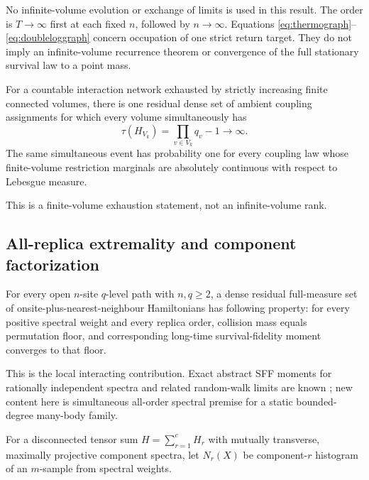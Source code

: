 No infinite-volume evolution or exchange of limits is used in this result.
The order is $T\to\infty$ first at each fixed $n$, followed by
$n\to\infty$.  Equations \eqref{eq:thermograph}--\eqref{eq:doubleloggraph}
concern occupation of one strict return target.  They do not imply an
infinite-volume recurrence theorem or convergence of the full stationary
survival law to a point mass.

\begin{theorem}
\label{thm:exhaustion}
For a countable interaction network exhausted by strictly increasing finite
connected volumes, there is one residual dense set of ambient coupling
assignments for which every volume simultaneously has
\begin{equation}
 \tau(H_{V_k})=\prod_{v\in V_k}q_v-1\longrightarrow\infty.
 \label{eq:exhaustionrank}
\end{equation}
The same simultaneous event has probability one for every coupling law
whose finite-volume restriction marginals are absolutely continuous with
respect to Lebesgue measure.
\end{theorem}

This is a finite-volume exhaustion statement, not an infinite-volume rank.

\subsection{All-replica extremality and component factorization}

\begin{theorem}
\label{thm:pathcollision}
For every open $n$-site $q$-level path with $n,q\ge2$, a dense residual
full-measure set of onsite-plus-nearest-neighbour Hamiltonians has following
property: for every positive spectral weight and every replica order,
collision mass equals permutation floor, and corresponding long-time
survival-fidelity moment converges to that floor.
\end{theorem}

This is the local interacting contribution.  Exact abstract SFF moments for
rationally independent spectra and related random-walk limits are known
\cite{CamposVenutiOdavicHamma2026}; new content here is simultaneous
all-order spectral premise for a static bounded-degree many-body family.

For a disconnected tensor sum $H=\sum_{r=1}^cH_r$ with mutually transverse,
maximally projective component spectra, let $N_r(X)$ be component-$r$
histogram of an $m$-sample from spectral weights.

